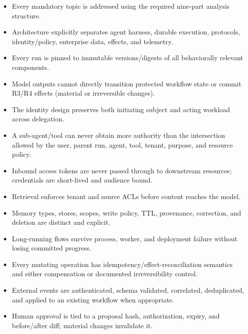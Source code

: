 \begin{itemize}

\item Every mandatory topic is addressed using the required nine-part analysis structure.

\item Architecture explicitly separates agent harness, durable execution, protocols, identity/policy, enterprise data, effects, and telemetry.

\item Every run is pinned to immutable versions/digests of all behaviorally relevant components.

\item Model outputs cannot directly transition protected workflow state or commit R3/R4 effects (material or irreversible changes).

\item The identity design preserves both initiating subject and acting workload across delegation.

\item A sub-agent/tool can never obtain more authority than the intersection allowed by the user, parent run, agent, tool, tenant, purpose, and resource policy.

\item Inbound access tokens are never passed through to downstream resources; credentials are short-lived and audience bound.

\item Retrieval enforces tenant and source ACLs before content reaches the model.

\item Memory types, stores, scopes, write policy, TTL, provenance, correction, and deletion are distinct and explicit.

\item Long-running flows survive process, worker, and deployment failure without losing committed progress.

\item Every mutating operation has idempotency/effect-reconciliation semantics and either compensation or documented irreversibility control.

\item External events are authenticated, schema validated, correlated, deduplicated, and applied to an existing workflow when appropriate.

\item Human approval is tied to a proposal hash, authorization, expiry, and before/after diff; material changes invalidate it.


\end{itemize}
